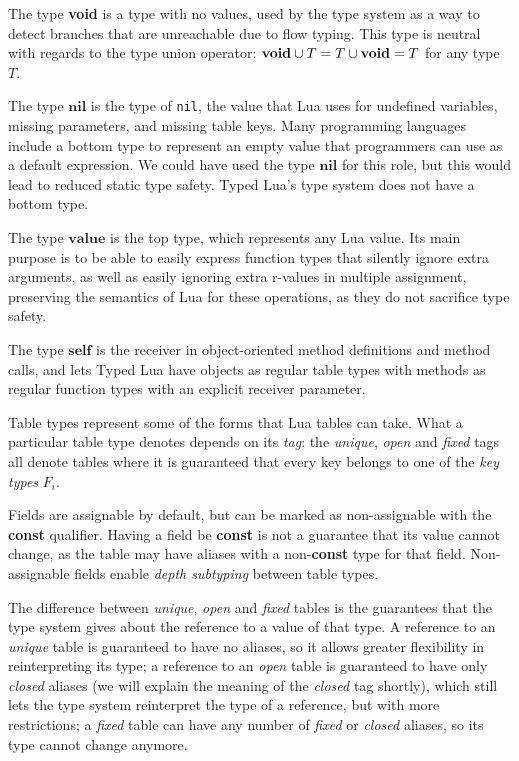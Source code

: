 \documentclass[preprint]{sigplanconf}
\newcommand{\Value}{\mathbf{value}}
\newcommand{\Nil}{\mathbf{nil}}
\newcommand{\Self}{\mathbf{self}}
\begin{document}
The type {\bf void} is a type with no values, used by the
type system as a way to detect branches that are unreachable
due to flow typing. This type is neutral with regards to
the type union operator: ${\bf void} \cup T = T \cup {\bf void} = T$ for any type $T$.

The type $\Nil$ is the type of {\tt nil}, the value that Lua uses for undefined variables, missing parameters, and missing table keys.
Many programming languages include a bottom type to represent
an empty value that programmers can use as a default expression.
We could have used the type $\Nil$ for this role, but
this would lead to reduced static type safety. Typed Lua's
type system does not have a bottom type.

The type $\Value$ is the top type, which represents any Lua value.
Its main purpose is to be able to easily express function types
that silently ignore extra arguments, as well as easily ignoring extra r-values in multiple assignment, preserving the semantics of Lua for these operations, as they do not sacrifice type safety.

The type $\Self$ is the receiver in object-oriented method
definitions and method calls, and lets Typed Lua have objects
as regular table types with methods as regular function types
with an explicit receiver parameter.

Table types represent some of the forms that Lua
tables can take. What a particular table type denotes
depends on its {\em tag}: the {\em unique}, {\em open}
and {\em fixed} tags all denote tables where it is
guaranteed that every key belongs to one of the {\em key
types} $F_i$. 

Fields are assignable by default, but can be marked
as non-assignable with the {\bf const} qualifier. Having
a field be {\bf const} is not a guarantee that its
value cannot change, as the table may have aliases with
a non-{\bf const} type for that field. Non-assignable
fields enable {\em depth subtyping} between table types.

The difference between {\em unique}, {\em open} and
{\em fixed} tables is the guarantees that the type system
gives about the reference to a value of that type. A reference
to an {\em unique} table is guaranteed to have no aliases,
so it allows greater flexibility in reinterpreting its type;
a reference to an {\em open} table is guaranteed to have
only {\em closed} aliases (we will explain the meaning of the {\em closed} tag shortly), which still lets the type system
reinterpret the type of a reference, but with more
restrictions; a {\em fixed} table can have any number of {\em fixed} or {\em closed} aliases, so its type cannot change
anymore.
\end{document}
